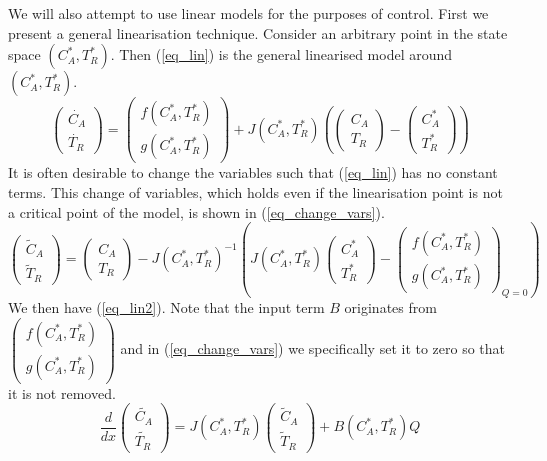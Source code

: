 We will also attempt to use linear models for the purposes of control. First we present a general linearisation technique. Consider an arbitrary point in the state space $(C_A^*, T_R^*)$. Then (\ref{eq_lin}) is the general linearised model around $(C_A^*, T_R^*)$.
\begin{equation}
\begin{pmatrix}
\dot{C_A} \\ \dot{T_R}
\end{pmatrix} = \begin{pmatrix}
f(C_A^*, T_R^*) \\ g(C_A^*, T_R^*)
\end{pmatrix} + J(C_A^*, T_R^*) \left( \begin{pmatrix}
C_A \\ T_R
\end{pmatrix} - \begin{pmatrix}
C_A^* \\ T_R^* 
\end{pmatrix}\right)
\label{eq_lin}
\end{equation}
It is often desirable to change the variables such that (\ref{eq_lin}) has no constant terms. This change of variables, which holds even if the linearisation point is not a critical point of the model, is shown in (\ref{eq_change_vars}). 
\begin{equation}
\begin{pmatrix}
\tilde{C}_A \\ \tilde{T}_R
\end{pmatrix} = \begin{pmatrix}
C_A \\ T_R
\end{pmatrix} - J(C_A^*, T_R^*)^{-1}\left(J(C_A^*, T_R^*)\begin{pmatrix}
C_A^* \\ T_R^* 
\end{pmatrix} - \begin{pmatrix}
f(C_A^*, T_R^*) \\ g(C_A^*, T_R^*)
\end{pmatrix}_{Q=0} \right)
\label{eq_change_vars}
\end{equation}
We then have (\ref{eq_lin2}). Note that the input term $B$ originates from $\begin{pmatrix}
f(C_A^*, T_R^*) \\ g(C_A^*, T_R^*)
\end{pmatrix}$ and in (\ref{eq_change_vars}) we specifically set it to zero so that it is not removed.
\begin{equation}
\frac{d}{dx}\begin{pmatrix}
\tilde{C_A} \\ \tilde{T_R}
\end{pmatrix} =  J(C_A^*, T_R^*)\begin{pmatrix}
\tilde{C}_A \\ \tilde{T}_R
\end{pmatrix} + B(C_A^*, T_R^*)Q
\label{eq_lin2}
\end{equation}

